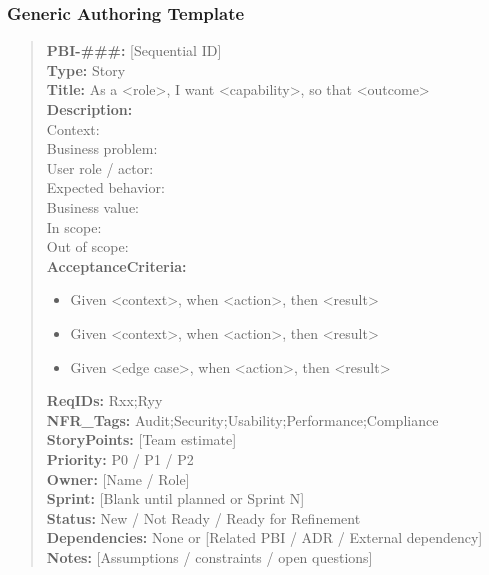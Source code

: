 \documentclass[11pt,a4paper]{article}
\begin{document}
\subsubsection*{Generic Authoring Template}
\begin{quote}
\textbf{PBI-\#\#\#:} [Sequential ID] \\
\textbf{Type:} Story \\
\textbf{Title:} As a \textless role\textgreater, I want \textless capability\textgreater, so that \textless outcome\textgreater \\

\textbf{Description:} \\
Context: \\
Business problem: \\
User role / actor: \\
Expected behavior: \\
Business value: \\
In scope: \\
Out of scope: \\

\textbf{AcceptanceCriteria:}
\begin{itemize}[leftmargin=1.5em]
    \item Given \textless context\textgreater, when \textless action\textgreater, then \textless result\textgreater
    \item Given \textless context\textgreater, when \textless action\textgreater, then \textless result\textgreater
    \item Given \textless edge case\textgreater, when \textless action\textgreater, then \textless result\textgreater
\end{itemize}

\textbf{ReqIDs:} Rxx;Ryy \\
\textbf{NFR\_Tags:} Audit;Security;Usability;Performance;Compliance \\
\textbf{StoryPoints:} [Team estimate] \\
\textbf{Priority:} P0 / P1 / P2 \\
\textbf{Owner:} [Name / Role] \\
\textbf{Sprint:} [Blank until planned or Sprint N] \\
\textbf{Status:} New / Not Ready / Ready for Refinement \\
\textbf{Dependencies:} None or [Related PBI / ADR / External dependency] \\
\textbf{Notes:} [Assumptions / constraints / open questions]
\end{quote}
\end{document}
